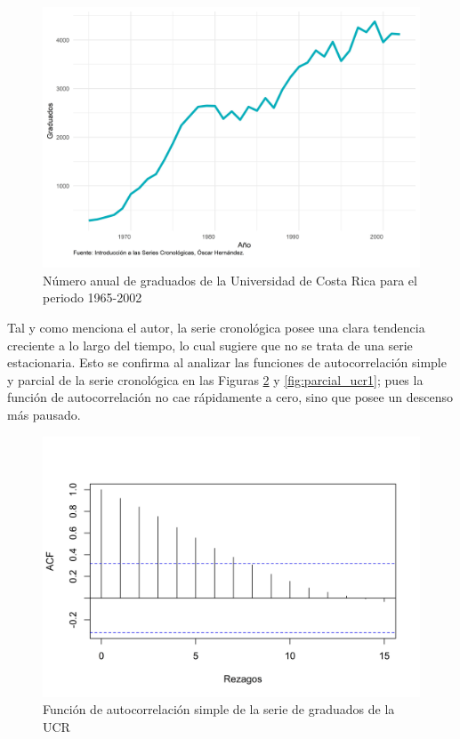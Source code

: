 \documentclass[
]{article}
\begin{document}
\begin{figure}[H]
\includegraphics[width=1\linewidth,height=1\textheight]{Tesis_files/figure-latex/ejemplo_ucr-1} \caption{Número anual de graduados de la Universidad de Costa Rica para el periodo 1965-2002}\label{fig:ejemplo_ucr}
\end{figure}

Tal y como menciona el autor, la serie cronológica posee una clara
tendencia creciente a lo largo del tiempo, lo cual sugiere que no se
trata de una serie estacionaria. Esto se confirma al analizar las
funciones de autocorrelación simple y parcial de la serie cronológica en
las Figuras \ref{fig:auto_ucr1} y \ref{fig:parcial_ucr1}; pues la
función de autocorrelación no cae rápidamente a cero, sino que posee un
descenso más pausado.

\begin{figure}[H]
\includegraphics[width=1\linewidth,height=1\textheight]{Tesis_files/figure-latex/auto_ucr1-1} \caption{Función de autocorrelación simple de la serie de graduados de la UCR}\label{fig:auto_ucr1}
\end{figure}
\end{document}
